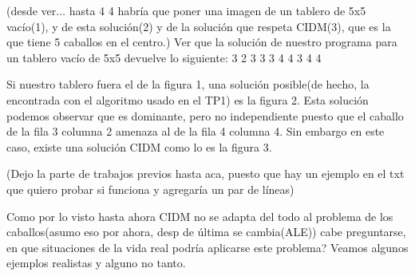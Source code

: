 \documentclass[a4paper]{article}
\begin{document}
(desde ver... hasta 4 4 habría que poner una imagen de un tablero de 5x5 vacío(1), y de esta solución(2) y de la solución que respeta CIDM(3), que es la que tiene 5 caballos en el centro.)
Ver que la solución de nuestro programa para un tablero vacío de 5x5 devuelve lo siguiente:
3 2 
3 3 
3 4 
4 3 
4 4

Si nuestro tablero fuera el de la figura 1, una solución posible(de hecho, la encontrada con el algoritmo usado en el TP1) es la figura 2. Esta solución podemos observar que es dominante, pero no independiente puesto que el caballo de la fila 3 columna 2 amenaza al de la fila 4 columna 4. Sin embargo en este caso, existe una solución CIDM como lo es la figura 3. 

(Dejo la parte de trabajos previos hasta aca, puesto que hay un ejemplo en el txt que quiero probar si funciona y agregaría un par de líneas)

Como por lo visto hasta ahora CIDM no se adapta del todo al problema de los caballos(asumo eso por ahora, desp de última se cambia(ALE)) cabe preguntarse, en que situaciones de la vida real podría aplicarse este problema? Veamos algunos ejemplos realistas y alguno no tanto.
\end{document}
